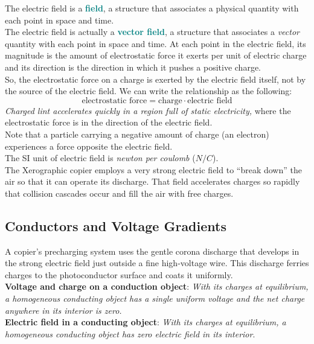 \documentclass[12pt]{article}
\theoremstyle{definition}
\newcommand{\defnterm}[1]{\textbf{\textcolor{teal}{#1}}\index{#1}}
\begin{document}
The electric field is a \defnterm{field}, a structure that associates a physical quantity with each point in space and time. \\
The electric field is actually a \defnterm{vector field}, a structure that associates a \emph{vector} quantity with each point in space and time.
At each point in the electric field, its magnitude is the amount of electrostatic force it exerts per unit of electric charge and its direction is the direction in which it pushes a positive charge. \\

So, the electrostatic force on a charge is exerted by the electric field itself, not by the source of the electric field.
We can write the relationship as the following:
$$\text{electrostatic force} = \text{charge} \cdot \text{electric field}$$
\emph{Charged lint accelerates quickly in a region full of static electricity,} where the electrostatic force is in the direction of the electric field. \\
Note that a particle carrying a negative amount of charge (an electron) experiences a force opposite the electric field. \\
The SI unit of electric field is \emph{newton per coulomb} ($N/C$). \\

The Xerographic copier employs a very strong electric field to ``break down'' the air so that it can operate its discharge.
That field accelerates charges so rapidly that collision cascades occur and fill the air with free charges.

\subsection{Conductors and Voltage Gradients}
A copier's precharging system uses the gentle corona discharge that develops in the strong electric field just outside a fine high-voltage wire.
This discharge ferries charges to the photoconductor surface and coats it uniformly. \\

\textbf{Voltage and charge on a conduction object}:
\emph{With its charges at equilibrium, a homogeneous conducting object has a single uniform voltage and the net charge anywhere in its interior is zero.} \\

\textbf{Electric field in a conducting object}:
\emph{With its charges at equilibrium, a homogeneous conducting object has zero electric field in its interior}. \\
\end{document}
